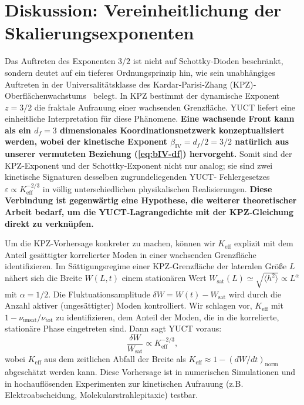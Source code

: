 \documentclass[12pt,a4paper]{article}
\newcommand{\Keff}{K_{\mathrm{eff}}}
\begin{document}
	\section{Diskussion: Vereinheitlichung der Skalierungsexponenten}
	
	Das Auftreten des Exponenten $3/2$ ist nicht auf Schottky‑Dioden beschränkt,
	sondern deutet auf ein tieferes Ordnungsprinzip hin, wie sein unabhängiges
	Auftreten in der Universalitätsklasse des Kardar‑Parisi‑Zhang (KPZ)‑
	Oberflächenwachstums~\cite{KPZ} belegt. In KPZ bestimmt der dynamische
	Exponent $z = 3/2$ die fraktale Aufrauung einer wachsenden Grenzfläche.
	YUCT liefert eine einheitliche Interpretation für diese Phänomene.
	\textbf{Eine wachsende Front kann als ein $d_f = 3$ dimensionales
		Koordinationsnetzwerk konzeptualisiert werden, wobei der kinetische Exponent
		$\beta_{\mathrm{IV}} = d_f/2 = 3/2$ natürlich aus unserer vermuteten
		Beziehung (\ref{eq:bIV-df}) hervorgeht.}
	Somit sind der KPZ‑Exponent und der Schottky‑Exponent nicht nur analog;
	sie sind zwei kinetische Signaturen desselben zugrundeliegenden YUCT‑
	Fehlergesetzes $\varepsilon \propto \Keff^{-2/3}$ in völlig unterschiedlichen
	physikalischen Realisierungen. \textbf{Diese Verbindung ist gegenwärtig eine
		Hypothese, die weiterer theoretischer Arbeit bedarf, um die YUCT‑Lagrangedichte
		mit der KPZ‑Gleichung direkt zu verknüpfen.}
	
	Um die KPZ‑Vorhersage konkreter zu machen, können wir $\Keff$ explizit mit
	dem Anteil gesättigter korrelierter Moden in einer wachsenden Grenzfläche
	identifizieren. Im Sättigungsregime einer KPZ‑Grenzfläche der lateralen
	Größe $L$ nähert sich die Breite $W(L,t)$ einem stationären Wert
	$W_{\text{sat}}(L) \simeq \sqrt{\langle h^2 \rangle} \propto L^{\alpha}$ mit
	$\alpha = 1/2$. Die Fluktuationsamplitude $\delta W = W(t) - W_{\text{sat}}$
	wird durch die Anzahl aktiver (ungesättigter) Moden kontrolliert. Wir
	schlagen vor, $\Keff$ mit $1 - \nu_{\text{unsat}}/\nu_{\text{tot}}$ zu
	identifizieren, dem Anteil der Moden, die in die korrelierte, stationäre
	Phase eingetreten sind. Dann sagt YUCT voraus:
	\begin{equation}
		\frac{\delta W}{W_{\text{sat}}} \propto \Keff^{-2/3},
		\label{eq:kpz-prediction}
	\end{equation}
	wobei $\Keff$ aus dem zeitlichen Abfall der Breite als
	$\Keff \approx 1 - (dW/dt)_{\text{norm}}$ abgeschätzt werden kann. Diese
	Vorhersage ist in numerischen Simulationen und in hochauflösenden
	Experimenten zur kinetischen Aufrauung (z.B. Elektroabscheidung,
	Molekularstrahlepitaxie) testbar.
	
\end{document}
